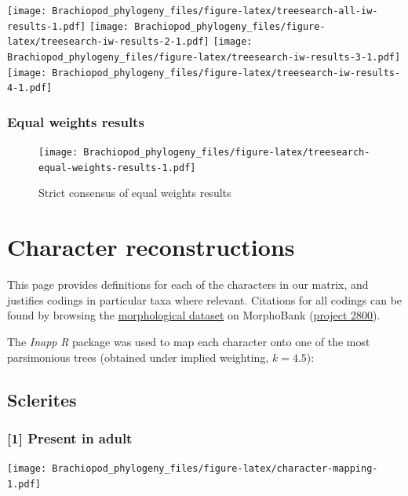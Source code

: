 \documentclass[]{book}
\theoremstyle{definition}
\theoremstyle{definition}
\theoremstyle{definition}
\theoremstyle{remark}
\begin{document}
\texttt{[image: Brachiopod\_phylogeny\_files/figure-latex/treesearch-all-iw-results-1.pdf]}
\texttt{[image: Brachiopod\_phylogeny\_files/figure-latex/treesearch-iw-results-2-1.pdf]}
\texttt{[image: Brachiopod\_phylogeny\_files/figure-latex/treesearch-iw-results-3-1.pdf]}
\texttt{[image: Brachiopod\_phylogeny\_files/figure-latex/treesearch-iw-results-4-1.pdf]}

\hypertarget{equal-weights-results}{%
\subsection{Equal weights results}\label{equal-weights-results}}

\begin{figure}
\centering
\texttt{[image: Brachiopod\_phylogeny\_files/figure-latex/treesearch-equal-weights-results-1.pdf]}
\caption{\label{fig:treesearch-equal-weights-results}Strict consensus of
equal weights results}
\end{figure}

\hypertarget{reconstructions}{%
\chapter{Character reconstructions}\label{reconstructions}}

This page provides definitions for each of the characters in our matrix,
and justifies codings in particular taxa where relevant. Citations for
all codings can be found by browsing the
\protect\hyperlink{dataset}{morphological dataset} on MorphoBank
(\href{https://morphobank.org/permalink/?P2800}{project 2800}).

The \emph{Inapp} \emph{R} package \citep{Brazeau2018} was used to map
each character onto one of the most parsimonious trees (obtained under
implied weighting, \(k = 4.5\)):

\hypertarget{sclerites}{%
\section{Sclerites}\label{sclerites}}

\hypertarget{present-in-adult}{%
\subsection*{{[}1{]} Present in adult}\label{present-in-adult}}

\texttt{[image: Brachiopod\_phylogeny\_files/figure-latex/character-mapping-1.pdf]}
\end{document}

